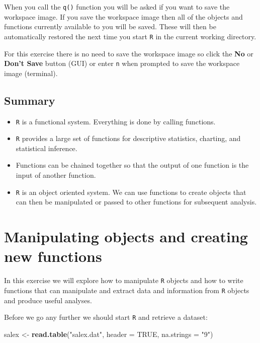 \documentclass[12pt,]{book}
\newenvironment{Shaded}{\begin{snugshade}}{\end{snugshade}}
\newcommand{\KeywordTok}[1]{\textcolor[rgb]{0.13,0.29,0.53}{\textbf{#1}}}
\newcommand{\DataTypeTok}[1]{\textcolor[rgb]{0.13,0.29,0.53}{#1}}
\newcommand{\StringTok}[1]{\textcolor[rgb]{0.31,0.60,0.02}{#1}}
\newcommand{\OtherTok}[1]{\textcolor[rgb]{0.56,0.35,0.01}{#1}}
\newcommand{\NormalTok}[1]{#1}
\providecommand{\tightlist}{%
  \setlength{\itemsep}{0pt}\setlength{\parskip}{0pt}}
\theoremstyle{definition}
\theoremstyle{definition}
\theoremstyle{definition}
\theoremstyle{remark}
\begin{document}
When you call the \texttt{q()} function you will be asked if you want to
save the workspace image. If you save the workspace image then all of
the objects and functions currently available to you will be saved.
These will then be automatically restored the next time you start
\texttt{R} in the current working directory.

For this exercise there is no need to save the workspace image so click
the \textbf{No} or \textbf{Don't Save} button (GUI) or enter \texttt{n}
when prompted to save the workspace image (terminal).

\hypertarget{summary}{%
\section{Summary}\label{summary}}

\begin{itemize}
\tightlist
\item
  \texttt{R} is a functional system. Everything is done by calling
  functions.
\item
  \texttt{R} provides a large set of functions for descriptive
  statistics, charting, and statistical inference.
\item
  Functions can be chained together so that the output of one function
  is the input of another function.
\item
  \texttt{R} is an object oriented system. We can use functions to
  create objects that can then be manipulated or passed to other
  functions for subsequent analysis.
\end{itemize}

\hypertarget{exercise2}{%
\chapter{Manipulating objects and creating new
functions}\label{exercise2}}

In this exercise we will explore how to manipulate \texttt{R} objects
and how to write functions that can manipulate and extract data and
information from \texttt{R} objects and produce useful analyses.

Before we go any further we should start \texttt{R} and retrieve a
dataset:

\begin{Shaded}
\begin{Highlighting}[]
\NormalTok{salex <-}\StringTok{ }\KeywordTok{read.table}\NormalTok{(}\StringTok{"salex.dat"}\NormalTok{, }\DataTypeTok{header =} \OtherTok{TRUE}\NormalTok{, }\DataTypeTok{na.strings =} \StringTok{"9"}\NormalTok{)}
\end{Highlighting}
\end{Shaded}
\end{document}
